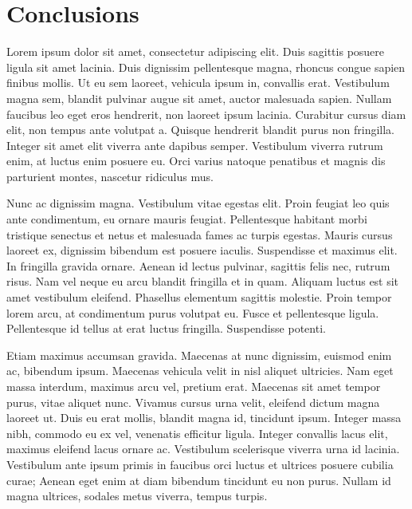 \documentclass[
  letterpaper,
  DIV=11,
  numbers=noendperiod]{scrreprt}
\begin{document}
\chapter*{Conclusions}\label{conclusions}


Lorem ipsum dolor sit amet, consectetur adipiscing elit. Duis sagittis
posuere ligula sit amet lacinia. Duis dignissim pellentesque magna,
rhoncus congue sapien finibus mollis. Ut eu sem laoreet, vehicula ipsum
in, convallis erat. Vestibulum magna sem, blandit pulvinar augue sit
amet, auctor malesuada sapien. Nullam faucibus leo eget eros hendrerit,
non laoreet ipsum lacinia. Curabitur cursus diam elit, non tempus ante
volutpat a. Quisque hendrerit blandit purus non fringilla. Integer sit
amet elit viverra ante dapibus semper. Vestibulum viverra rutrum enim,
at luctus enim posuere eu. Orci varius natoque penatibus et magnis dis
parturient montes, nascetur ridiculus mus.

Nunc ac dignissim magna. Vestibulum vitae egestas elit. Proin feugiat
leo quis ante condimentum, eu ornare mauris feugiat. Pellentesque
habitant morbi tristique senectus et netus et malesuada fames ac turpis
egestas. Mauris cursus laoreet ex, dignissim bibendum est posuere
iaculis. Suspendisse et maximus elit. In fringilla gravida ornare.
Aenean id lectus pulvinar, sagittis felis nec, rutrum risus. Nam vel
neque eu arcu blandit fringilla et in quam. Aliquam luctus est sit amet
vestibulum eleifend. Phasellus elementum sagittis molestie. Proin tempor
lorem arcu, at condimentum purus volutpat eu. Fusce et pellentesque
ligula. Pellentesque id tellus at erat luctus fringilla. Suspendisse
potenti.

Etiam maximus accumsan gravida. Maecenas at nunc dignissim, euismod enim
ac, bibendum ipsum. Maecenas vehicula velit in nisl aliquet ultricies.
Nam eget massa interdum, maximus arcu vel, pretium erat. Maecenas sit
amet tempor purus, vitae aliquet nunc. Vivamus cursus urna velit,
eleifend dictum magna laoreet ut. Duis eu erat mollis, blandit magna id,
tincidunt ipsum. Integer massa nibh, commodo eu ex vel, venenatis
efficitur ligula. Integer convallis lacus elit, maximus eleifend lacus
ornare ac. Vestibulum scelerisque viverra urna id lacinia. Vestibulum
ante ipsum primis in faucibus orci luctus et ultrices posuere cubilia
curae; Aenean eget enim at diam bibendum tincidunt eu non purus. Nullam
id magna ultrices, sodales metus viverra, tempus turpis.
\end{document}
